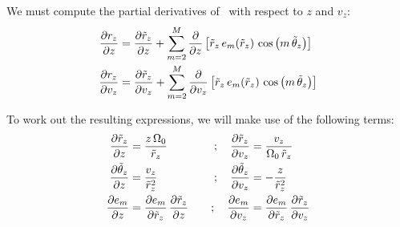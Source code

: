 We must compute the partial derivatives of \rz\ with respect to $z$ and $v_z$:
\begin{align}
    \frac{\partial r_z}{\partial z} &=
        \frac{\partial \tilde{r}_z}{\partial z} +
        \sum_{m=2}^{M} \frac{\partial}{\partial z} \left[\tilde{r}_z \, e_m(\tilde{r}_z) \, \cos\left(m \, \tilde{\theta}_z\right)\right]\\
    \frac{\partial r_z}{\partial v_z} &=
        \frac{\partial \tilde{r}_z}{\partial v_z} +
        \sum_{m=2}^{M} \frac{\partial}{\partial v_z} \left[\tilde{r}_z \, e_m(\tilde{r}_z) \, \cos\left(m \, \tilde{\theta}_z\right)\right]
\end{align}

To work out the resulting expressions, we will make use of the following terms:
\begin{alignat}{3}
    \frac{\partial \tilde{r}_z}{\partial z} &= \frac{z\,\Omega_0}{\tilde{r}_z} \quad &; \quad
        \frac{\partial \tilde{r}_z}{\partial v_z} &= \frac{v_z}{\Omega_0 \, \tilde{r}_z} \\
    \frac{\partial \tilde{\theta}_z}{\partial z} &= \frac{v_z}{\tilde{r}_z^2} \quad &; \quad
        \frac{\partial \tilde{\theta}_z}{\partial v_z} &= -\frac{z}{\tilde{r}_z^2} \\
    \frac{\partial e_m}{\partial z} &=
        \frac{\partial e_m}{\partial \tilde{r}_z} \, \frac{\partial \tilde{r}_z}{\partial z}
        \quad &; \quad
        \frac{\partial e_m}{\partial v_z} &=
        \frac{\partial e_m}{\partial \tilde{r}_z} \, \frac{\partial \tilde{r}_z}{\partial v_z}
\end{alignat}

